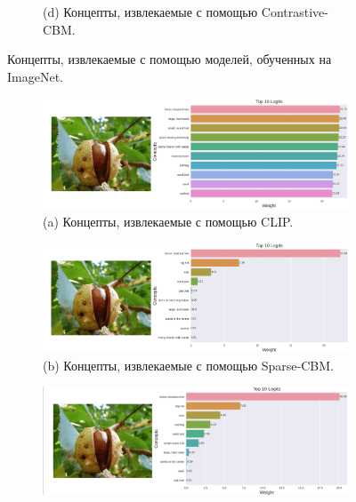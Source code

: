 \begin{figure}[h]
\begin{subfigure}
    \\
    (d) Концепты, извлекаемые с помощью Contrastive-CBM.
    \end{subfigure}
    \caption{Концепты, извлекаемые с помощью моделей, обученных на ImageNet.}
    \label{fig:concepts_4}
\end{figure}

\begin{figure}[h] %
\centering
   \begin{subfigure}%
     \centering
    \includegraphics[width=0.7\linewidth]{./figures/clip_im_5-compressed.png}
    \\
    (a) Концепты, извлекаемые с помощью CLIP.
    \end{subfigure}
    \begin{subfigure}%
    \centering
      \includegraphics[width=0.7\linewidth]{./figures/sparse_im_5-compressed.png}
    \\
    (b) Концепты, извлекаемые с помощью Sparse-CBM.
    \end{subfigure}
    \begin{subfigure}%
     \centering
  \includegraphics[width=0.75\linewidth]{./figures/l1_im_5-compressed.png}

\end{subfigure}
\end{figure}
